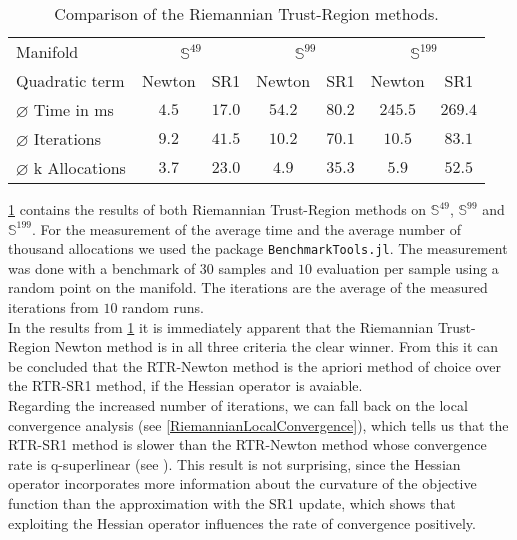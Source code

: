 \begin{table}[H]
    \centering
        \begin{tabular}{lcccccc}
            \toprule
            Manifold & \multicolumn{2}{c}{$\mathbb{S}^{49}$}& \multicolumn{2}{c}{$\mathbb{S}^{99}$} & \multicolumn{2}{c}{$\mathbb{S}^{199}$}\\ 
            \cmidrule(lr){2-3} \cmidrule(lr){4-5} \cmidrule(lr){6-7}
            Quadratic term & Newton & SR1 & Newton & SR1 & Newton & SR1 \\ 

            $\varnothing$ Time in ms & $4.5$ & $17.0$ & $54.2$ & $80.2$ & $245.5$ & $269.4$\\ 
            $\varnothing$ Iterations & $9.2$ & $41.5$ & $10.2$ & $70.1$ & $10.5$ & $83.1$ \\
            $\varnothing$ k Allocations& $3.7$ & $23.0$ & $4.9$ & $35.3$ & $5.9$ & $52.5$ \\
            \bottomrule
        \end{tabular}
    \caption{Comparison of the Riemannian Trust-Region methods.} \label{tab:Results}
\end{table}
\cref{tab:Results} contains the results of both Riemannian Trust-Region methods on $\mathbb{S}^{49}$, $\mathbb{S}^{99}$ and $\mathbb{S}^{199}$. For the measurement of the average time and the average number of thousand allocations we used the package \lstinline!BenchmarkTools.jl!. The measurement was done with a benchmark of $30$ samples and $10$ evaluation per sample using a random point on the manifold. The iterations are the average of the measured iterations from $10$ random runs. \\
In the results from \cref{tab:Results} it is immediately apparent that the Riemannian Trust-Region Newton method is in all three criteria the clear winner. From this it can be concluded that the RTR-Newton method is the apriori method of choice over the RTR-SR1 method, if the Hessian operator is avaiable. \\
Regarding the increased number of iterations, we can fall back on the local convergence analysis (see \cref{RiemannianLocalConvergence}), which tells us that the RTR-SR1 method is slower than the RTR-Newton method whose convergence rate is q-superlinear (see \cite[Theorem~4.13]{AbsilBakerGallivan:2007}). This result is not surprising, since the Hessian operator incorporates more information about the curvature of the objective function than the approximation with the SR1 update, which shows that exploiting the Hessian operator influences the rate of convergence positively. \\ 
